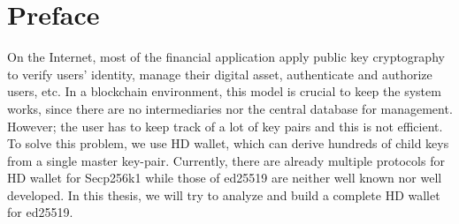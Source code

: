 \chapter*{Preface}
\thispagestyle{fancy}
\label{preface}
\hspace*{5cm}

On the Internet, most of the financial application apply public key cryptography to verify users' identity, manage their digital asset, authenticate and authorize users, etc. In a blockchain environment, this model is crucial to keep the system works, since there are no intermediaries nor the central database for management. However; the user has to keep track of a lot of key pairs and this is not efficient.
To solve this problem, we use HD wallet, which can derive hundreds of child keys from a single master key-pair. Currently, there are already multiple protocols for HD wallet for Secp256k1 while those of ed25519 are neither well known nor well developed. In this thesis, we will try to analyze and build a complete HD wallet for ed25519.

\cleardoublepage